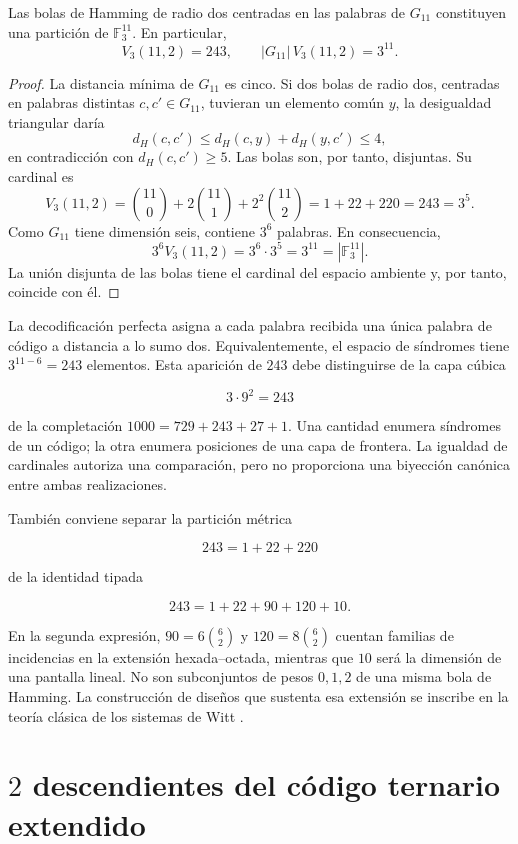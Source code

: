 \begin{theorem}[Perfección de \(G_{11}\)]
\label{thm:g11-perfecto}
Las bolas de Hamming de radio dos centradas en las palabras de \(G_{11}\)
constituyen una partición de \(\mathbb F_3^{11}\). En particular,
\[
V_3(11,2)=243,
\qquad
|G_{11}|\,V_3(11,2)=3^{11}.
\]
\end{theorem}

\begin{proof}
La distancia mínima de \(G_{11}\) es cinco. Si dos bolas de radio dos,
centradas en palabras distintas \(c,c'\in G_{11}\), tuvieran un elemento
común \(y\), la desigualdad triangular daría
\[
d_H(c,c')\leq d_H(c,y)+d_H(y,c')\leq4,
\]
en contradicción con \(d_H(c,c')\geq5\). Las bolas son, por tanto,
disjuntas. Su cardinal es
\[
V_3(11,2)
=\binom{11}{0}+2\binom{11}{1}+2^2\binom{11}{2}
=1+22+220=243=3^5.
\]
Como \(G_{11}\) tiene dimensión seis, contiene \(3^6\) palabras. En
consecuencia,
\[
3^6V_3(11,2)=3^6\cdot3^5=3^{11}
=|\mathbb F_3^{11}|.
\]
La unión disjunta de las bolas tiene el cardinal del espacio ambiente y, por
tanto, coincide con él.
\end{proof}

La decodificación perfecta asigna a cada palabra recibida una única palabra
de código a distancia a lo sumo dos. Equivalentemente, el espacio de
síndromes tiene \(3^{11-6}=243\) elementos. Esta aparición de \(243\) debe
distinguirse de la capa cúbica

\[
3\cdot9^2=243
\]

de la completación \(1000=729+243+27+1\). Una cantidad enumera síndromes de
un código; la otra enumera posiciones de una capa de frontera. La igualdad
de cardinales autoriza una comparación, pero no proporciona una biyección
canónica entre ambas realizaciones.

También conviene separar la partición métrica

\[
243=1+22+220
\]

de la identidad tipada

\[
243=1+22+90+120+10.
\]

En la segunda expresión, \(90=6\binom62\) y
\(120=8\binom62\) cuentan familias de incidencias en la extensión
hexada--octada, mientras que \(10\) será la dimensión de una pantalla lineal.
No son subconjuntos de pesos \(0,1,2\) de una misma bola de Hamming.
La construcción de diseños que sustenta esa extensión se inscribe en la
teoría clásica de los sistemas de Witt \cite{AssmusKey1992}.

\section{\(2\) descendientes del código ternario extendido}
\label{sec:dos-descendientes-cw}

